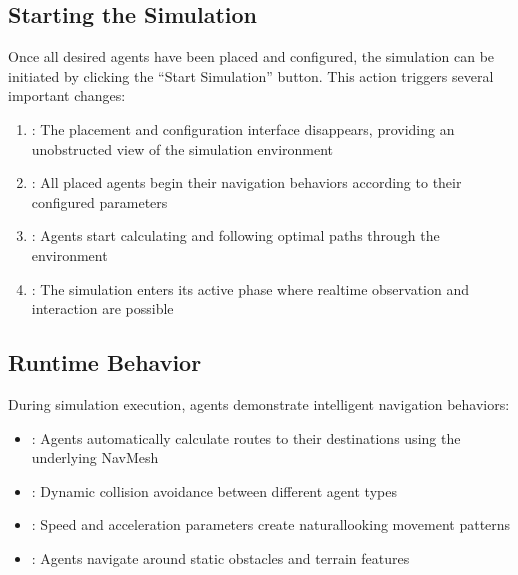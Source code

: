 \documentclass[letterpaper,10pt,english]{jupyterBook}
\begin{document}
\subsection{Starting the Simulation}
\label{\detokenize{The Simulation:starting-the-simulation}}
\sphinxAtStartPar
Once all desired agents have been placed and configured, the simulation can be initiated by clicking the “Start Simulation” button. This action triggers several important changes:
\begin{enumerate}
%
\item {} 
\sphinxAtStartPar
{}: The placement and configuration interface disappears, providing an unobstructed view of the simulation environment

\item {} 
\sphinxAtStartPar
{}: All placed agents begin their navigation behaviors according to their configured parameters

\item {} 
\sphinxAtStartPar
{}: Agents start calculating and following optimal paths through the environment

\item {} 
\sphinxAtStartPar
{}: The simulation enters its active phase where real\sphinxhyphen{}time observation and interaction are possible

\end{enumerate}


\subsection{Runtime Behavior}
\label{\detokenize{The Simulation:runtime-behavior}}
\sphinxAtStartPar
During simulation execution, agents demonstrate intelligent navigation behaviors:
\begin{itemize}
\item {} 
\sphinxAtStartPar
{}: Agents automatically calculate routes to their destinations using the underlying NavMesh

\item {} 
\sphinxAtStartPar
{}: Dynamic collision avoidance between different agent types

\item {} 
\sphinxAtStartPar
{}: Speed and acceleration parameters create natural\sphinxhyphen{}looking movement patterns

\item {} 
\sphinxAtStartPar
{}: Agents navigate around static obstacles and terrain features

\end{itemize}
\end{document}
